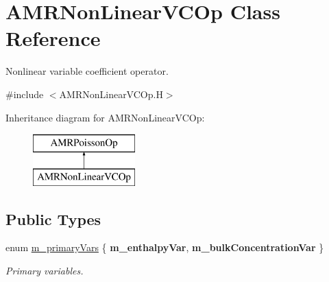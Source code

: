 \hypertarget{class_a_m_r_non_linear_v_c_op}{\section{A\-M\-R\-Non\-Linear\-V\-C\-Op Class Reference}
\label{class_a_m_r_non_linear_v_c_op}
}


Nonlinear variable coefficient operator.  




{\ttfamily \#include $<$A\-M\-R\-Non\-Linear\-V\-C\-Op.\-H$>$}

Inheritance diagram for A\-M\-R\-Non\-Linear\-V\-C\-Op\-:\begin{figure}[H]
\begin{center}
\leavevmode
\includegraphics[height=2.000000cm]{class_a_m_r_non_linear_v_c_op}
\end{center}
\end{figure}
\subsection*{Public Types}
\begin{DoxyCompactItemize}
\item 
enum \hyperlink{class_a_m_r_non_linear_v_c_op_a325a5f93d334682aee9b727684c2ddc7}{m\-\_\-primary\-Vars} \{ {\bfseries m\-\_\-enthalpy\-Var}, 
{\bfseries m\-\_\-bulk\-Concentration\-Var}
 \}
\begin{DoxyCompactList}\small\item\em Primary variables. \end{DoxyCompactList}\end{DoxyCompactItemize}
